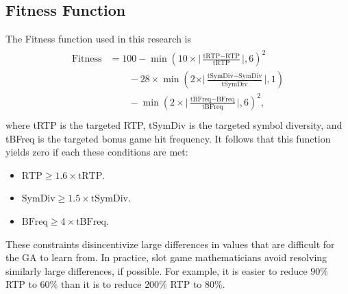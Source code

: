 \documentclass[conference]{IEEEtran}
\begin{document}
\subsection{Fitness Function}
The Fitness function used in this research is 
\begin{align}
   \begin{aligned}
      \text{Fitness}&= 100 - \min(10\times \bigl| \frac{\text{tRTP} - \text{RTP}}{\text{tRTP}}\bigr|, 6)^2\\
      &\text{ }\text{ }\text{ }- 28\times\min(2\times \vert \frac{\text{tSymDiv} - \text{SymDiv}}{\text{tSymDiv}} \vert, 1) \\
      &\text{ }\text{ }\text{ }- \min(2\times \bigl| \frac{\text{tBFreq} - \text{BFreq}}{\text{tBFreq}} \bigr|, 6)^2, \\
   \end{aligned}
\label{fitness}
\end{align}
where tRTP is the targeted RTP, tSymDiv is the targeted symbol diversity, and tBFreq is the targeted bonus game hit frequency.
It follows that this function yields zero if each these conditions are met:
\begin{itemize}
\item $\text{RTP} \geq 1.6\times \text{tRTP}$.
\item $\text{SymDiv} \geq 1.5\times \text{tSymDiv}$.
\item $\text{BFreq} \geq 4\times \text{tBFreq}$.
\end{itemize}
These constraints disincentivize large differences in values that are difficult for the GA to learn from.
In practice, slot game mathematicians avoid resolving similarly large differences, if possible.
For example, it is easier to reduce $90\%$ RTP to $60\%$ than it is to reduce $200\%$ RTP to $80\%$.
\end{document}
